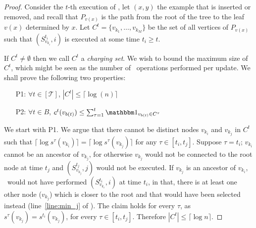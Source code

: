 \begin{proof}

Consider the $t$-th execution of \AlgoUpdate, let $(x,y)$ the example that is inserted or removed, and recall that $P_{v(x)}$ is the path from the root of the tree to the leaf $v(x)$ determined by $x$. Let $C^{t} = \{v_{k_1} ,\dots, v_{k_M}\}$ be the set of all vertices of $P_{v(x)}$ such that \AlgoBuild$(S^{t_i}_{v_{k_i}}, i)$ is executed at some time $t_i \geq t$.

If $C^t \ne \emptyset$ then we call $C^t$ a \emph{charging set}. We wish to bound the maximum size of $C^t$, which might be seen as the number of \AlgoBuild\ operations performed per update. We shall prove the following two properties:
\begin{itemize}

\item[P1:]  $\forall t \in [\mathcal{T}]$, $|C^t| \leq \lceil \log ( n )  \rceil$

\item[P2:] $\forall t \in B$, $c^t(v_{b(t)}) \leq \sum_{\tau=1}^{t} \Ind_{v_{b(t)} \in C^{\tau}}$
\end{itemize}
We start with P1. We argue that there cannot be distinct nodes $v_{k_i}$ and $v_{k_j}$ in $C^{t}$ such that $ \lceil \log s^{\tau}(v_{k_i}) \rceil   = \lceil \log s^{\tau}(v_{k_j}) \rceil$ for any $\tau \in [t_i,t_j]$.
Suppose $\tau=t_i$; $v_{k_i}$ cannot be an ancestor of $v_{k_j}$, for otherwise $v_{k_j}$ would not be connected to the root node at time $t_j$ and \AlgoBuild$(S^{t_j}_{v_{k_j}},j)$ would not be executed. If $v_{k_j}$ is an ancestor of $v_{k_i}$, \AlgoUpdate\ would not have performed \AlgoBuild$(S^{t_i}_{ v_{k_i}},i)$ at time $t_i$, in that, there is at least one other node ($v_{k_j}$) which is closer to the root and that would have been selected instead (line~\ref{line:min_j} of \AlgoUpdate). The claim holds for every $\tau$, as $s^{\tau} (v_{k_j})=s^{t_i} (v_{k_j})$, for every $\tau \in [t_i,t_j]$. Therefore $|C^t| \leq \lceil \log n  \rceil$.  


\end{proof}
